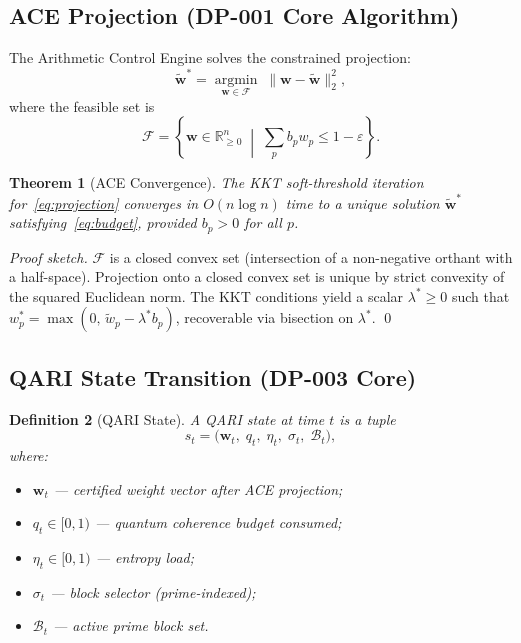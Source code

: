 \documentclass[12pt,letterpaper]{article}
\newtheorem{theorem}{Theorem}[section]
\newtheorem{definition}[theorem]{Definition}
\begin{document}
\subsection{ACE Projection (DP-001 Core Algorithm)}

The Arithmetic Control Engine solves the constrained projection:
\begin{equation}
  \tilde{\mathbf{w}}^* = \operatorname*{argmin}_{\mathbf{w} \in \mathcal{F}}
  \;\|\mathbf{w} - \tilde{\mathbf{w}}\|_2^2,
  \label{eq:projection}
\end{equation}
where the feasible set is
\[
  \mathcal{F} = \left\{ \mathbf{w} \in \mathbb{R}^n_{\geq 0}
    \;\middle|\; \sum_p b_p w_p \leq 1 - \varepsilon \right\}.
\]

\begin{theorem}[ACE Convergence]
The KKT soft-threshold iteration for~\eqref{eq:projection} converges
in $O(n \log n)$ time to a unique solution $\tilde{\mathbf{w}}^*$
satisfying~\eqref{eq:budget}, provided $b_p > 0$ for all $p$.
\end{theorem}

\begin{proof}[Proof sketch]
$\mathcal{F}$ is a closed convex set (intersection of a non-negative
orthant with a half-space). Projection onto a closed convex set is
unique by strict convexity of the squared Euclidean norm. The KKT
conditions yield a scalar $\lambda^* \geq 0$ such that
$w_p^* = \max(0,\, \tilde{w}_p - \lambda^* b_p)$,
recoverable via bisection on $\lambda^*$. \qed
\end{proof}

\subsection{QARI State Transition (DP-003 Core)}

\begin{definition}[QARI State]
A \emph{QARI state} at time $t$ is a tuple
\[
  s_t = \bigl( \mathbf{w}_t,\; q_t,\; \eta_t,\; \sigma_t,\; \mathcal{B}_t \bigr),
\]
where:
\begin{itemize}
  \item $\mathbf{w}_t$ --- certified weight vector after ACE projection;
  \item $q_t \in [0,1)$ --- quantum coherence budget consumed;
  \item $\eta_t \in [0,1)$ --- entropy load;
  \item $\sigma_t$ --- block selector (prime-indexed);
  \item $\mathcal{B}_t$ --- active prime block set.
\end{itemize}
\end{definition}
\end{document}
